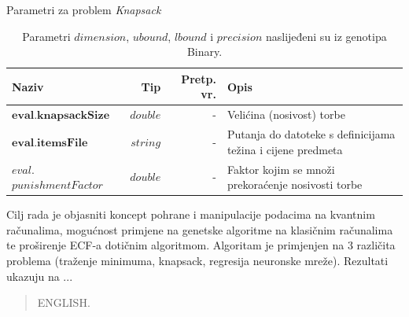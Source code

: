 \documentclass[times, utf8, zavrsni]{fer}
\begin{document}
\begin{table}[htb]
\caption{Parametri za problem \it Knapsack\rm}
\label{tbl:param_kvareg}
\centering
\caption*{\footnotesize Parametri $dimension$, $ubound$, $lbound$ i $precision$ naslijeđeni su iz genotipa Binary.}
\begin{tabular}{|p{4cm}|r|r|p{6cm}|} \hline
Naziv & Tip & Pretp. vr. & Opis\\ \hline
$\textbf{eval.knapsackSize}$ & $double$ & - & Velićina (nosivost) torbe \\
$\textbf{eval.itemsFile}$ & $string$ & - & Putanja do datoteke s definicijama težina i cijene predmeta \\
$eval.$ $punishmentFactor$ & $double$ & - & Faktor kojim se množi prekoraćenje nosivosti torbe \\ \hline
\end{tabular}
\end{table}

\begin{sazetak}
Cilj rada je objasniti koncept pohrane i manipulacije podacima na kvantnim računalima, mogućnost primjene na genetske algoritme na klasičnim računalima te proširenje ECF-a dotičnim algoritmom. Algoritam je primjenjen na 3 različita problema (traženje minimuma, knapsack, regresija neuronske mreže). Rezultati ukazuju na ...

\end{sazetak}

\begin{abstract}
ENGLISH.

\end{abstract}
\end{document}
